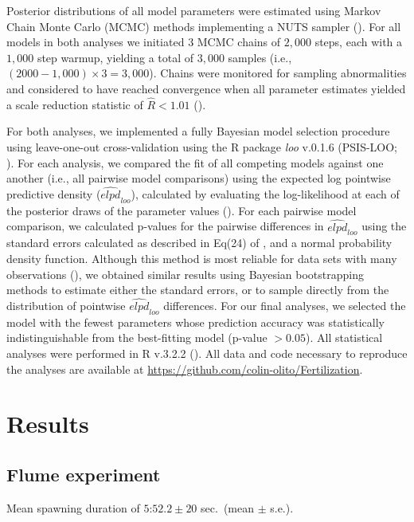 \documentclass{article}
\begin{document}
	Posterior distributions of all model parameters were estimated using Markov Chain Monte Carlo (MCMC) methods implementing a NUTS sampler (\citealt{Stan2016}). For all models in both analyses we initiated $3$ MCMC chains of $2,000$ steps, each with a $1,000$ step warmup, yielding a total of $3,000$ samples (i.e., $(2000 - 1,000) \times 3 = 3,000$). Chains were monitored for sampling abnormalities and considered to have reached convergence when all parameter estimates yielded a scale reduction statistic of $\hat{R} < 1.01$ (\citealt{GelmanRubin1992}).

	For both analyses, we implemented a fully Bayesian model selection procedure using leave-one-out cross-validation using the R package \textit{loo} v.0.1.6 (PSIS-LOO; \citealt{Vehtari2016}). For each analysis, we compared the fit of all competing models against one another (i.e., all pairwise model comparisons) using the expected log pointwise predictive density ($\widehat{\textit{elpd}}_{\textit{loo}}$), calculated by evaluating the log-likelihood at each of the posterior draws of the parameter values (\citealt{HootenHobbs2015,Vehtari2016}). For each pairwise model comparison, we calculated p-values for the pairwise differences in $\widehat{\textit{elpd}}_{\textit{loo}}$ using the standard errors calculated as described in Eq(24) of \citet{Vehtari2016}, and a normal probability density function. Although this method is most reliable for data sets with many observations (\citealt{Vehtari2016}), we obtained similar results using Bayesian bootstrapping methods to estimate either the standard errors, or to sample directly from the distribution of pointwise $\widehat{\textit{elpd}}_{\textit{loo}}$ differences. For our final analyses, we selected the model with the fewest parameters whose prediction accuracy was statistically indistinguishable from the best-fitting model (p-value $> 0.05$). All statistical analyses were performed in R v.3.2.2 (\citealt{R2016}). All data and code necessary to reproduce the analyses are available at \url{https://github.com/colin-olito/Fertilization}.

\section*{Results}

	\subsection*{Flume experiment}

	Mean spawning duration of $5$:$52.2 \pm 20$ sec.~(mean $\pm$ s.e.).
\end{document}
